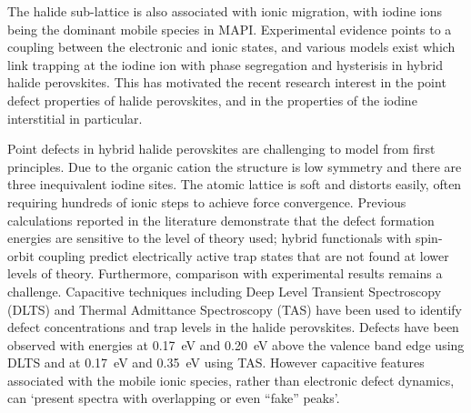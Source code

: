 The halide sub-lattice is also associated with ionic migration, with iodine ions being the dominant mobile species in MAPI.\autocite{Senocrate2017} 
Experimental evidence points to a coupling between the electronic and ionic states, and various models exist which link trapping at the iodine ion with phase segregation and hysterisis in hybrid halide perovskites.\autocite{dequilettes2016}
This has motivated the recent research interest in the point defect properties of halide perovskites, and in the properties of the iodine interstitial in particular.

Point defects in hybrid halide perovskites are challenging to model from first principles. Due to the organic cation the structure is low symmetry and there are three inequivalent iodine sites. The atomic lattice is soft and distorts easily, often requiring hundreds of ionic steps to achieve force convergence. 
Previous calculations reported in the literature demonstrate that the defect formation energies are sensitive to the level of theory used; hybrid functionals with spin-orbit coupling predict electrically active trap states that are not found at lower levels of theory.
Furthermore, comparison with experimental results remains a challenge. Capacitive techniques including Deep Level Transient Spectroscopy (DLTS) and Thermal Admittance Spectroscopy (TAS) have been used to identify defect concentrations and trap levels in the halide perovskites.
Defects have been observed with energies at \SI{0.17}{\electronvolt} and \SI{0.20}{\electronvolt} above the valence band edge using DLTS\autocite{rosenberg2017} and at \SI{0.17}{\electronvolt} and \SI{0.35}{\electronvolt} using TAS.
However capacitive features associated with the mobile ionic species, rather than electronic defect dynamics, can `present spectra with overlapping or even ``fake'' peaks'.\autocite{Almora2019}

